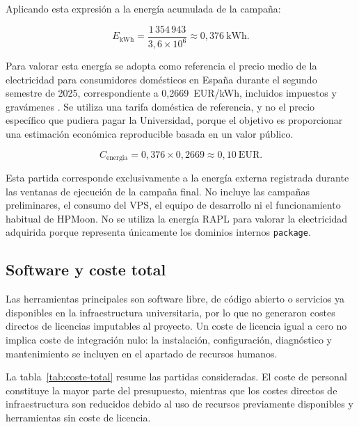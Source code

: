 Aplicando esta expresión a la energía acumulada de la campaña:

\[
    E_{\mathrm{kWh}} =
    \frac{1\,354\,943}{3{,}6\times10^6}
    \approx 0{,}376~\mathrm{kWh}.
\]

Para valorar esta energía se adopta como referencia el precio medio de la electricidad para consumidores domésticos en España durante el segundo semestre de 2025, correspondiente a 0,2669~EUR/kWh, incluidos impuestos y gravámenes \parencite{eurostatElectricidad2025}. Se utiliza una tarifa doméstica de referencia, y no el precio específico que pudiera pagar la Universidad, porque el objetivo es proporcionar una estimación económica reproducible basada en un valor público.

\begin{equation}
    C_{\mathrm{energia}} =
    0{,}376 \times 0{,}2669
    \approx 0{,}10~\mathrm{EUR}.
    \label{eq:coste-energia}
\end{equation}

Esta partida corresponde exclusivamente a la energía externa registrada durante las ventanas de ejecución de la campaña final. No incluye las campañas preliminares, el consumo del VPS, el equipo de desarrollo ni el funcionamiento habitual de HPMoon. No se utiliza la energía RAPL para valorar la electricidad adquirida porque representa únicamente los dominios internos \texttt{package}.

\subsection{Software y coste total}

Las herramientas principales son software libre, de código abierto o servicios ya disponibles en la infraestructura universitaria, por lo que no generaron costes directos de licencias imputables al proyecto. Un coste de licencia igual a cero no implica coste de integración nulo: la instalación, configuración, diagnóstico y mantenimiento se incluyen en el apartado de recursos humanos.

La tabla~\ref{tab:coste-total} resume las partidas consideradas. El coste de personal constituye la mayor parte del presupuesto, mientras que los costes directos de infraestructura son reducidos debido al uso de recursos previamente disponibles y herramientas sin coste de licencia.

